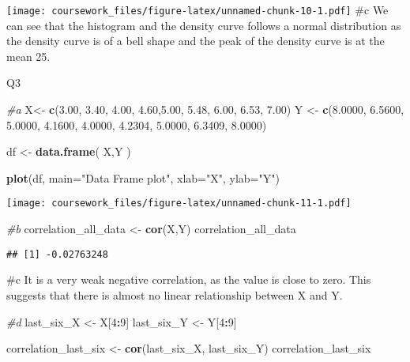 \documentclass[
]{article}
\newenvironment{Shaded}{\begin{snugshade}}{\end{snugshade}}
\newcommand{\AttributeTok}[1]{\textcolor[rgb]{0.13,0.29,0.53}{#1}}
\newcommand{\CommentTok}[1]{\textcolor[rgb]{0.56,0.35,0.01}{\textit{#1}}}
\newcommand{\DecValTok}[1]{\textcolor[rgb]{0.00,0.00,0.81}{#1}}
\newcommand{\FloatTok}[1]{\textcolor[rgb]{0.00,0.00,0.81}{#1}}
\newcommand{\FunctionTok}[1]{\textcolor[rgb]{0.13,0.29,0.53}{\textbf{#1}}}
\newcommand{\NormalTok}[1]{#1}
\newcommand{\OtherTok}[1]{\textcolor[rgb]{0.56,0.35,0.01}{#1}}
\newcommand{\SpecialCharTok}[1]{\textcolor[rgb]{0.81,0.36,0.00}{\textbf{#1}}}
\newcommand{\StringTok}[1]{\textcolor[rgb]{0.31,0.60,0.02}{#1}}
\begin{document}
\texttt{[image: coursework\_files/figure-latex/unnamed-chunk-10-1.pdf]}
\#c We can see that the histogram and the density curve follows a normal
distribution as the density curve is of a bell shape and the peak of the
density curve is at the mean 25.

Q3

\begin{Shaded}
\begin{Highlighting}[]
\CommentTok{\#a}
\NormalTok{X}\OtherTok{\textless{}{-}} \FunctionTok{c}\NormalTok{(}\FloatTok{3.00}\NormalTok{, }\FloatTok{3.40}\NormalTok{, }\FloatTok{4.00}\NormalTok{, }\FloatTok{4.60}\NormalTok{,}\FloatTok{5.00}\NormalTok{, }\FloatTok{5.48}\NormalTok{, }\FloatTok{6.00}\NormalTok{, }\FloatTok{6.53}\NormalTok{, }\FloatTok{7.00}\NormalTok{)}
\NormalTok{Y }\OtherTok{\textless{}{-}} \FunctionTok{c}\NormalTok{(}\FloatTok{8.0000}\NormalTok{, }\FloatTok{6.5600}\NormalTok{, }\FloatTok{5.0000}\NormalTok{, }\FloatTok{4.1600}\NormalTok{, }\FloatTok{4.0000}\NormalTok{, }\FloatTok{4.2304}\NormalTok{, }\FloatTok{5.0000}\NormalTok{, }\FloatTok{6.3409}\NormalTok{, }\FloatTok{8.0000}\NormalTok{)}

\NormalTok{df }\OtherTok{\textless{}{-}} \FunctionTok{data.frame}\NormalTok{(}
\NormalTok{ X,Y}
\NormalTok{)}


\FunctionTok{plot}\NormalTok{(df, }\AttributeTok{main=}\StringTok{"Data Frame plot"}\NormalTok{, }\AttributeTok{xlab=}\StringTok{"X"}\NormalTok{, }\AttributeTok{ylab=}\StringTok{"Y"}\NormalTok{)}
\end{Highlighting}
\end{Shaded}

\texttt{[image: coursework\_files/figure-latex/unnamed-chunk-11-1.pdf]}

\begin{Shaded}
\begin{Highlighting}[]
\CommentTok{\#b}
\NormalTok{correlation\_all\_data }\OtherTok{\textless{}{-}} \FunctionTok{cor}\NormalTok{(X,Y)}
\NormalTok{correlation\_all\_data}
\end{Highlighting}
\end{Shaded}

\begin{verbatim}
## [1] -0.02763248
\end{verbatim}

\#c It is a very weak negative correlation, as the value is close to
zero. This suggests that there is almost no linear relationship between
X and Y.

\begin{Shaded}
\begin{Highlighting}[]
\CommentTok{\#d}
\NormalTok{last\_six\_X }\OtherTok{\textless{}{-}}\NormalTok{ X[}\DecValTok{4}\SpecialCharTok{:}\DecValTok{9}\NormalTok{]}
\NormalTok{last\_six\_Y }\OtherTok{\textless{}{-}}\NormalTok{ Y[}\DecValTok{4}\SpecialCharTok{:}\DecValTok{9}\NormalTok{]}

\NormalTok{correlation\_last\_six }\OtherTok{\textless{}{-}} \FunctionTok{cor}\NormalTok{(last\_six\_X, last\_six\_Y)}
\NormalTok{correlation\_last\_six}
\end{Highlighting}
\end{Shaded}
\end{document}
